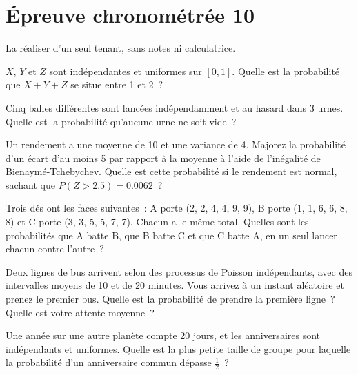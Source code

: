 \chapter{Épreuve chronométrée 10}\label{ch:iv1:timed-test-10}

\begin{ivtrains}
La réaliser d'un seul tenant, sans notes ni calculatrice.
\end{ivtrains}


\begin{question}\label{iq:iv1:timed-test-10:1}
$X$, $Y$ et $Z$ sont indépendantes et uniformes sur $[0, 1]$. Quelle est la probabilité que $X + Y + Z$ se situe entre 1 et 2~?
\end{question}

\begin{question}\label{iq:iv1:timed-test-10:2}
Cinq balles différentes sont lancées indépendamment et au hasard dans 3 urnes. Quelle est la probabilité qu'aucune urne ne soit vide~?
\end{question}

\begin{question}\label{iq:iv1:timed-test-10:3}
Un rendement a une moyenne de 10 et une variance de 4. Majorez la probabilité d'un écart d'au moins 5 par rapport à la moyenne à l'aide de l'inégalité de Bienaymé-Tchebychev. Quelle est cette probabilité si le rendement est normal, sachant que $P(Z > 2.5) = 0.0062$~?
\end{question}

\begin{question}\label{iq:iv1:timed-test-10:4}
Trois dés ont les faces suivantes~: A porte (2, 2, 4, 4, 9, 9), B porte (1, 1, 6, 6, 8, 8) et C porte (3, 3, 5, 5, 7, 7). Chacun a le même total. Quelles sont les probabilités que A batte B, que B batte C et que C batte A, en un seul lancer chacun contre l'autre~?
\end{question}

\begin{question}\label{iq:iv1:timed-test-10:5}
Deux lignes de bus arrivent selon des processus de Poisson indépendants, avec des intervalles moyens de 10 et de 20 minutes. Vous arrivez à un instant aléatoire et prenez le premier bus. Quelle est la probabilité de prendre la première ligne~? Quelle est votre attente moyenne~?
\end{question}

\begin{question}\label{iq:iv1:timed-test-10:6}
Une année sur une autre planète compte 20 jours, et les anniversaires sont indépendants et uniformes. Quelle est la plus petite taille de groupe pour laquelle la probabilité d'un anniversaire commun dépasse $\frac12$~?
\end{question}

